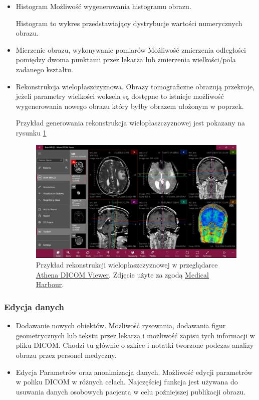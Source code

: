 \begin{itemize}
    \item Histogram
          Możliwość wygenerowania histogramu obrazu.

          Histogram to wykres przedstawiający dystrybucje wartości numerycznych obrazu.

    \item Mierzenie obrazu, wykonywanie pomiarów
          Możliwość zmierzenia odległości pomiędzy dwoma punktami przez lekarza lub zmierzenia wielkości/pola zadanego kształtu.

    \item Rekonstrukcja wielopłaszczyznowa.
          Obrazy tomograficzne obrazują przekroje, jeżeli parametry wielkości woksela są dostępne to istnieje możliwość wygenerowania nowego obrazu który byłby obrazem ułożonym w poprzek.

          Przykład generowania rekonstrukcja wielopłaszczyznowej jest pokazany na rysunku \ref{fig:dicomviewer003}

          \begin{figure}[!htbp]
              \centering
              \includegraphics[width=\textwidth]{img/dicom-viewer-003.jpeg}
              \caption{Przykład rekonstrukcji wielopłaszczyznowej w przeglądarce \href{https://athenadicomviewer.com/}{Athena DICOM Viewer}. Zdjęcie użyte za zgodą \href{https://medicalharbour.com/}{Medical Harbour}.}
              \label{fig:dicomviewer003}
          \end{figure}
\end{itemize}

\subsubsection{Edycja danych}

\begin{itemize}
    \item Dodawanie nowych obiektów.
          Możliwość rysowania, dodawania figur geometrycznych lub tekstu przez lekarza i możliwość zapisu tych informacji w pliku DICOM.
          Chodzi tu głównie o szkice i notatki tworzone podczas analizy obrazu przez personel medyczny.

    \item Edycja Parametrów oraz anonimizacja danych.
          Możliwość edycji parametrów w poliku DICOM w różnych celach.
          Najczęściej funkcja jest używana do usuwania danych osobowych pacjenta w celu poźniejszej publikacji obrazu.

\end{itemize}